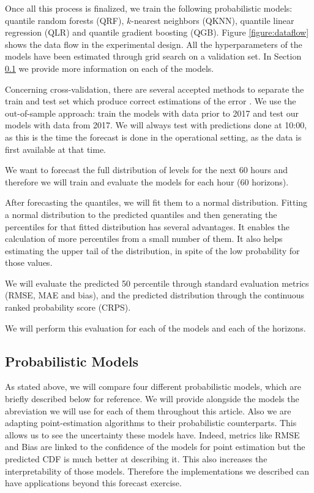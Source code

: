 \documentclass[a4paper,twocolumn,5p]{elsarticle}
\begin{document}
Once all this process is finalized, we train the following
probabilistic models: quantile random forests (QRF), $k$-nearest
neighbors (QKNN), quantile linear regression (QLR) and quantile
gradient boosting (QGB).  Figure \ref{figure:dataflow} shows the data
flow in the experimental design. All the hyperparameters of the models
have been estimated through grid search on a validation set.  
In Section \ref{sec:models}
we provide more information on each of the models.

Concerning cross-validation, there are several accepted methods to
separate the train and test set which produce correct estimations of
the error \cite{bergmeir_note_2018}. We use the out-of-sample
approach: train the models with data prior to 2017 and test our models
with data from 2017. We will always test with predictions done at
10:00, as this is the time the forecast is done in the operational
setting, as the data is first available at that time.

We want to forecast the full distribution of \no
levels for the next 60 hours and therefore we will train and evaluate
the models for each hour (60 horizons).

After forecasting the quantiles, we will fit them to a normal
distribution. Fitting a normal distribution to the predicted quantiles
and then generating the percentiles for that fitted distribution has
several advantages. It enables the calculation of more percentiles
from a small number of them.  It also helps estimating the upper tail
of the distribution, in spite of the low probability for those values.

We will evaluate the predicted 50 percentile through standard
evaluation metrics (RMSE, MAE and bias), and the predicted
distribution through the continuous ranked probability score (CRPS).

We will perform this evaluation for
each of the models and each of the horizons.

\subsection{Probabilistic Models}
\label{sec:models}

As stated above, we will compare four different probabilistic models,
which are briefly described below for reference. We will provide 
alongside the models the abreviation we will use for each of them 
throughout this article. Also we are adapting point-estimation 
algorithms to their probabilistic counterparts. This allows 
us to see the uncertainty these models have. Indeed, metrics like 
RMSE and Bias are linked to the confidence of the models for 
point estimation but the predicted CDF is much better at describing 
it. This also increases the interpretability of those models.
Therefore 
the implementations we described can have applications beyond 
this forecast exercise.
\end{document}

